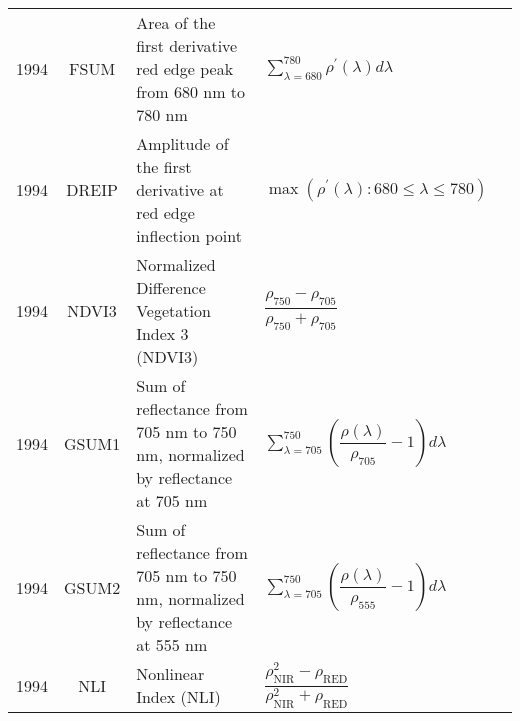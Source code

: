 \documentclass[10pt]{article}
\begin{document}
\begin{ThreePartTable}
\begin{longtable}{c c m{2.80in} M{2.80in} M{1.5in}}
  1994 & FSUM    & Area of the first derivative red edge peak from 680 nm to 780 nm               & $\sum\limits_{\lambda=680}^{780}\rho^\prime(\lambda)d\lambda$                                                                                                                                                                                                                           & \citet{Filella1994,Filella1995}                     \\
  1994 & DREIP   & Amplitude of the first derivative at red edge inflection point                 & $\max(\rho^\prime(\lambda) : 680\le\lambda\le780)$                                                                                                                                                                                                                                      & \citet{Filella1994,Filella1995}                     \\
  1994 & NDVI3   & Normalized Difference Vegetation Index 3 (NDVI3)                               & $\dfrac{\rho_{750}-\rho_{705}}{\rho_{750}+\rho_{705}}$                                                                                                                                                                                                                                  & \citet{Gitelson1994}                                \\
  1994 & GSUM1   & Sum of reflectance from 705 nm to 750 nm, normalized by reflectance at 705 nm  & $\sum\limits_{\lambda=705}^{750}\left(\dfrac{\rho(\lambda)}{\rho_{705}}-1\right)d\lambda$                                                                                                                                                                                               & \citet{Gitelson1994}                                \\
  1994 & GSUM2   & Sum of reflectance from 705 nm to 750 nm, normalized by reflectance at 555 nm  & $\sum\limits_{\lambda=705}^{750}\left(\dfrac{\rho(\lambda)}{\rho_{555}}-1\right)d\lambda$                                                                                                                                                                                               & \citet{Gitelson1994}                                \\
  1994 & NLI     & Nonlinear Index (NLI)                                                          & $\dfrac{\rho_\text{NIR}^2-\rho_\text{RED}}{\rho_\text{NIR}^2+\rho_\text{RED}}$                                                                                                                                                                                                          & \citet{Goel1994}                                    \\

\end{longtable}
\end{ThreePartTable}
\end{document}

